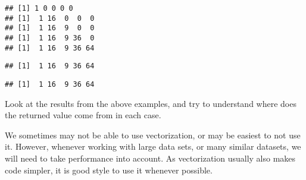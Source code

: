 \documentclass[paper=a4,10pt,div=17,headsepline,BCOR=12mm,twoside,open=right]{scrbook}\usepackage{knitr}
\begin{document}
\begin{knitrout}
\begin{kframe}
\begin{alltt}
  \hlstd{(}
   \hlkwb{<-} \hlopt{^}
\hlstd{\}}
\end{alltt}
\begin{verbatim}
## [1] 1 0 0 0 0
## [1]  1 16  0  0  0
## [1]  1 16  9  0  0
## [1]  1 16  9 36  0
## [1]  1 16  9 36 64
\end{verbatim}
\begin{alltt}
 
\end{alltt}
\begin{verbatim}
## [1]  1 16  9 36 64
\end{verbatim}
\begin{alltt}
 \hlkwb{<-} \hlopt{^}
\end{alltt}
\begin{verbatim}
## [1]  1 16  9 36 64
\end{verbatim}
\end{kframe}
\end{knitrout}

Look at the results from the above examples, and try to understand where does the returned value come from in each case.

We sometimes may not be able to use vectorization, or may be easiest to not use it. However, whenever working with large data sets, or many similar datasets, we will need to take performance into account. As vectorization usually also makes code simpler, it is good style to use it whenever possible.
\end{document}
